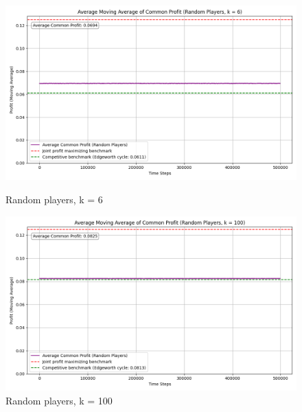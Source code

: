 \documentclass{article}
\begin{document}
\begin{figure}[H]
    \centering
    \begin{minipage}{0.75\linewidth}
        \centering
        \includegraphics[width=\linewidth]{RANDOM PLAYER, K=6.png}
        \caption{Random players, k = 6 }
        \label{fig: RANDOM K = 6}
    \end{minipage}
    \hfill
    \begin{minipage}{0.75\linewidth}
        \centering
        \includegraphics[width=\linewidth]{RANDOM PLAYER, K=100.png}
        \caption{Random players, k = 100}
        \label{fig: RANDOM K = 100}
    \end{minipage}
\end{figure}
\end{document}
